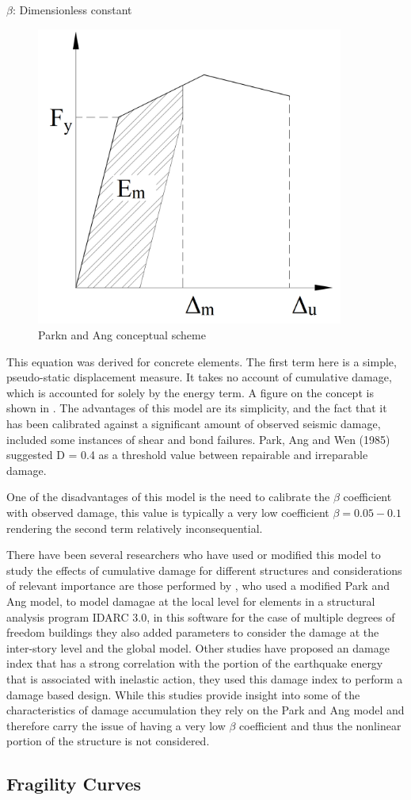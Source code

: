 $\beta$: Dimensionless constant 

\begin{figure}[htbp]
\centering
\includegraphics[width=0.9\textwidth]{Chapter-2/figs/Park_and_Ang_Model}
\caption{Parkn and Ang conceptual scheme}
\label{fig:Paa}
\end{figure}

This equation was derived for concrete elements. The first term here is a simple, pseudo-static displacement measure. It takes no account of cumulative damage, which is accounted for solely by the energy term. A figure on the concept is shown in . The advantages of this model are its simplicity, and the fact that it has been calibrated against a significant amount of observed seismic damage, included some instances of shear and bond failures. Park, Ang and Wen (1985) suggested D = 0.4 as a threshold value between repairable and irreparable damage. 

One of the disadvantages of this model is the need to calibrate the $\beta$ coefficient with observed damage, this value is typically a very low coefficient $\beta=0.05-0.1$ rendering the second term relatively inconsequential. 

There have been several researchers who have used or modified this model to study the effects of cumulative damage for different structures and considerations of relevant importance are those performed by \cite{Kunnath1992}, who used a modified Park and Ang model, to model damagae at the local level for elements in a structural analysis program IDARC 3.0, in this software for the case of multiple degrees of freedom buildings they also added parameters to consider the damage at the inter-story level and the global model. Other studies \cite{Khashaee} have proposed an damage index that has a strong correlation with the portion of the earthquake energy that is associated with inelastic action, they used this damage index to perform a damage based design. While this studies provide insight into some of the characteristics of damage accumulation they rely on the Park and Ang model and therefore carry the issue of having a very low $\beta$ coefficient and thus the nonlinear portion of the structure is not considered.

\subsection{Fragility Curves}
